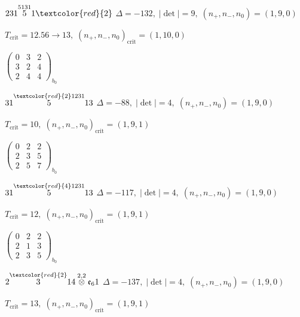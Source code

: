 \documentclass[10pt]{article}
\begin{document}
\smallskip

$231\overset{5131}{5}1\textcolor{red}{2}$ \quad $\Delta=-132,\; |\det|=9,\; (n_+,n_-,n_0)=(1,9,0)$

\hspace{1em}$T_{\text{crit}}=12.56 \to 13,\; (n_+,n_-,n_0)_{\text{crit}}=(1,10,0)$

\hspace{2em}$\left(\begin{smallmatrix}0 & 3 & 2 \\ 3 & 2 & 4 \\ 2 & 4 & 4\end{smallmatrix}\right)_{\!b_0}$

\smallskip

$31\overset{\textcolor{red}{2}1231}{5}13$ \quad $\Delta=-88,\; |\det|=4,\; (n_+,n_-,n_0)=(1,9,0)$

\hspace{1em}$T_{\text{crit}}=10,\; (n_+,n_-,n_0)_{\text{crit}}=(1,9,1)$

\hspace{2em}$\left(\begin{smallmatrix}0 & 2 & 2 \\ 2 & 3 & 5 \\ 2 & 5 & 7\end{smallmatrix}\right)_{\!b_0}$

$31\overset{\textcolor{red}{4}1231}{5}13$ \quad $\Delta=-117,\; |\det|=4,\; (n_+,n_-,n_0)=(1,9,0)$

\hspace{1em}$T_{\text{crit}}=12,\; (n_+,n_-,n_0)_{\text{crit}}=(1,9,1)$

\hspace{2em}$\left(\begin{smallmatrix}0 & 2 & 2 \\ 2 & 1 & 3 \\ 2 & 3 & 5\end{smallmatrix}\right)_{\!b_0}$

\smallskip

$2\overset{\textcolor{red}{2}}{3}14\overset{2,2}{\otimes}\mathfrak{e}_61$ \quad $\Delta=-137,\; |\det|=4,\; (n_+,n_-,n_0)=(1,9,0)$

\hspace{1em}$T_{\text{crit}}=13,\; (n_+,n_-,n_0)_{\text{crit}}=(1,9,1)$
\end{document}
